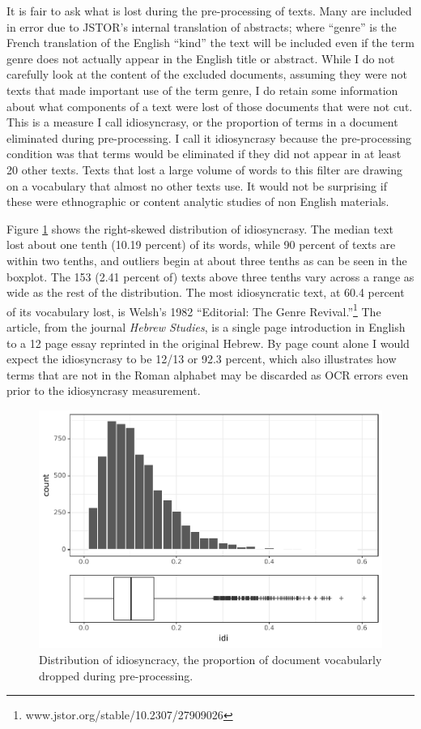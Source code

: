 \documentclass[]{book}
\let\rmarkdownfootnote\footnote%
\def\footnote{\protect\rmarkdownfootnote}
\theoremstyle{definition}
\theoremstyle{definition}
\theoremstyle{definition}
\theoremstyle{remark}
\begin{document}
It is fair to ask what is lost during the pre-processing of texts. Many
are included in error due to JSTOR's internal translation of abstracts;
where ``genre'' is the French translation of the English ``kind'' the
text will be included even if the term genre does not actually appear in
the English title or abstract. While I do not carefully look at the
content of the excluded documents, assuming they were not texts that
made important use of the term genre, I do retain some information about
what components of a text were lost of those documents that were not
cut. This is a measure I call idiosyncrasy, or the proportion of terms
in a document eliminated during pre-processing. I call it idiosyncrasy
because the pre-processing condition was that terms would be eliminated
if they did not appear in at least 20 other texts. Texts that lost a
large volume of words to this filter are drawing on a vocabulary that
almost no other texts use. It would not be surprising if these were
ethnographic or content analytic studies of non English materials.

Figure \ref{fig:idi-hist} shows the right-skewed distribution of
idiosyncrasy. The median text lost about one tenth (10.19 percent) of
its words, while 90 percent of texts are within two tenths, and outliers
begin at about three tenths as can be seen in the boxplot. The 153 (2.41
percent of) texts above three tenths vary across a range as wide as the
rest of the distribution. The most idiosyncratic text, at 60.4 percent
of its vocabulary lost, is Welsh's 1982 ``Editorial: The Genre
Revival.''\footnote{www.jstor.org/stable/10.2307/27909026} The article,
from the journal \emph{Hebrew Studies}, is a single page introduction in
English to a 12 page essay reprinted in the original Hebrew. By page
count alone I would expect the idiosyncrasy to be 12/13 or 92.3 percent,
which also illustrates how terms that are not in the Roman alphabet may
be discarded as OCR errors even prior to the idiosyncrasy measurement.

\begin{figure}

{\centering \includegraphics[width=0.9\linewidth]{03_files/figure-latex/idi-hist-1} 

}

\caption{Distribution of idiosyncracy, the proportion of document vocabularly dropped during pre-processing.}\label{fig:idi-hist}
\end{figure}
\end{document}
